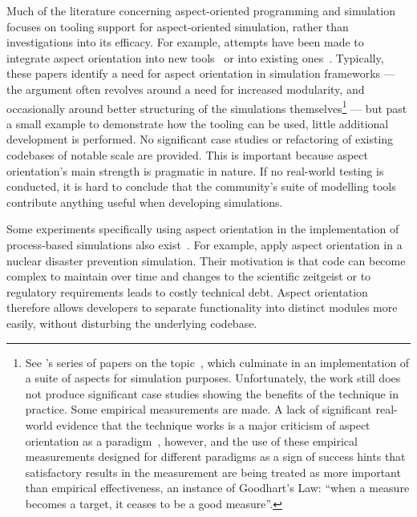 Much of the literature concerning aspect-oriented programming and simulation
focuses on tooling support for aspect-oriented simulation, rather than
investigations into its efficacy. For example, attempts have been made to
integrate aspect orientation into new
tools~\cite{DEVSaspectorientation2008aksu,ribault2008OSA,ribault2010osif,} or
into existing
ones~\cite{chibani2019using,DEVSaspectorientation2008aksu,wallis2018caise}.
Typically, these papers identify a need for aspect orientation in simulation
frameworks --- the argument often revolves around a need for increased
modularity, and occasionally around better structuring of the simulations
themselves\footnote{See \citeauthor{chibani2014practical}'s series of papers on
the topic~\cite{chibani2013toward,chibani2014practical,chibani2019using}, which
culminate in an implementation of a suite of aspects for simulation purposes.
Unfortunately, the work still does not produce significant case studies showing
the benefits of the technique in practice. Some empirical measurements are made.
A lack of significant real-world evidence that the technique works is a major
criticism of aspect orientation as a paradigm~\cite{steimann06paradoxical},
however, and the use of these empirical measurements designed for different
paradigms as a sign of success hints that satisfactory results in the
measurement are being treated as more important than empirical effectiveness, an
instance of Goodhart's Law: ``when a measure becomes a target, it ceases to be a
good measure''\cite{strathern1997improving}.} --- but past a small example to
demonstrate how the tooling can be used, little additional development is
performed. No significant case studies or refactoring of existing codebases of
notable scale are provided. This is important because aspect orientation's main
strength is pragmatic in nature. If no real-world testing is conducted, it is
hard to conclude that the community's suite of modelling tools contribute
anything useful when developing simulations.

Some experiments specifically using aspect orientation in the implementation of
process-based simulations also exist\cite{Ionescu_2009}~.
For example, \citeauthor{Ionescu_2009} apply aspect orientation in a nuclear
disaster prevention simulation. Their motivation is that code can become complex
to maintain over time and changes to the scientific zeitgeist or to regulatory
requirements leads to costly technical debt. Aspect orientation therefore allows
developers to separate functionality into distinct modules more easily, without
disturbing the underlying codebase.

